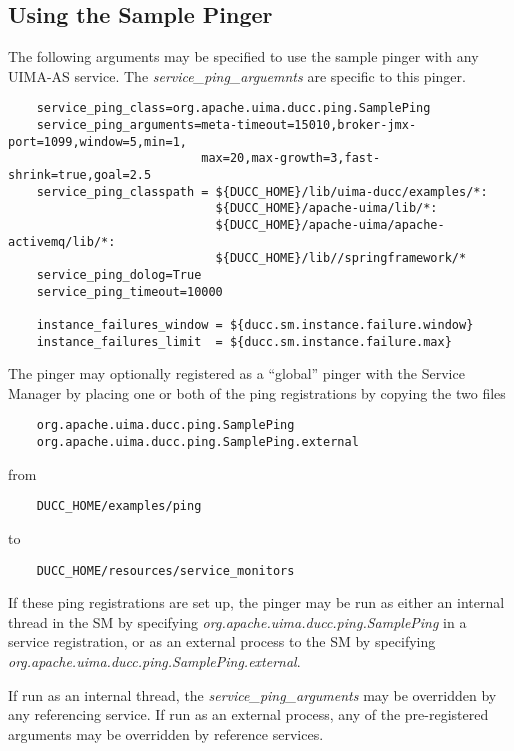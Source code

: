     \subsection{Using the Sample Pinger}
    The following arguments may be specified to use the sample pinger with any UIMA-AS service.  The
    {\em service\_ping\_arguemnts} are specific to this pinger.
\begin{verbatim}
    service_ping_class=org.apache.uima.ducc.ping.SamplePing
    service_ping_arguments=meta-timeout=15010,broker-jmx-port=1099,window=5,min=1,
                           max=20,max-growth=3,fast-shrink=true,goal=2.5
    service_ping_classpath = ${DUCC_HOME}/lib/uima-ducc/examples/*:
                             ${DUCC_HOME}/apache-uima/lib/*:
                             ${DUCC_HOME}/apache-uima/apache-activemq/lib/*:
                             ${DUCC_HOME}/lib//springframework/*
    service_ping_dolog=True
    service_ping_timeout=10000

    instance_failures_window = ${ducc.sm.instance.failure.window}
    instance_failures_limit  = ${ducc.sm.instance.failure.max}    
\end{verbatim}

    The pinger may optionally registered as a ``global'' pinger with the Service Manager by placing
    one or both of the ping registrations by copying the two files
\begin{verbatim}
    org.apache.uima.ducc.ping.SamplePing
    org.apache.uima.ducc.ping.SamplePing.external
\end{verbatim}
    from
\begin{verbatim}
    DUCC_HOME/examples/ping
\end{verbatim}
    to
\begin{verbatim}
    DUCC_HOME/resources/service_monitors
\end{verbatim}
    
    If these ping registrations are set up, the pinger may be run as either an
    internal thread in the SM by specifying {\em org.apache.uima.ducc.ping.SamplePing}
    in a service registration, or as an external process to the SM by
    specifying {\em org.apache.uima.ducc.ping.SamplePing.external}. 

    If run as an internal thread, the {\em service\_ping\_arguments} may be overridden
    by any referencing service.  If run as an external process, any of the
    pre-registered arguments may be overridden by reference services.

